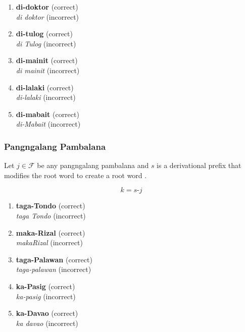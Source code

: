 \begin{example}
\end{example}
\begin{enumerate}
      \item \textbf{di-doktor} (correct) \\
            \textit{di doktor} (incorrect)
      \item \textbf{di-tulog} (correct) \\
            \textit{di Tulog} (incorrect)
      \item \textbf{di-mainit} (correct) \\
            \textit{di mainit} (incorrect)
      \item \textbf{di-lalaki} (correct) \\
            \textit{di-lalaki} (incorrect)
      \item \textbf{di-mabait} (correct) \\
            \textit{di-Mabait} (incorrect)
\end{enumerate}

\subsubsection{Pangngalang Pambalana}
\label{proper_nouns_chapter}
Let $j \in \mathcal{F}$ be any pangngalang pambalana and $s$ is a derivational prefix that modifies the root word to create a root word \cite{rafael2018}.

\[
      k = s\texttt{-}j
\]

\begin{example}
\end{example}
\begin{enumerate}
      \item \textbf{taga-Tondo} (correct) \\
            \textit{taga Tondo} (incorrect)
      \item \textbf{maka-Rizal} (correct) \\
            \textit{makaRizal} (incorrect)
      \item \textbf{taga-Palawan} (correct) \\
            \textit{taga-palawan} (incorrect)
      \item \textbf{ka-Pasig} (correct) \\
            \textit{ka-pasig} (incorrect)
      \item \textbf{ka-Davao} (correct) \\
            \textit{ka davao} (incorrect)
\end{enumerate}

